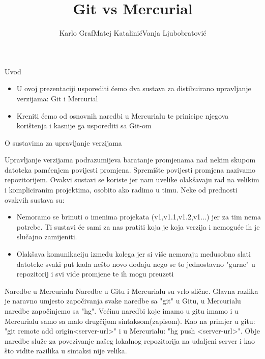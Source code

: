 \documentclass{beamer}
\title[]{Git vs Mercurial}
\author{Karlo Graf\newline Matej Katalinić\newline Vanja Ljubobratović}
\institute{Tehnički Fakultet, Sveučilište u Rijeci}
\begin{document}
\begin{frame}
  \titlepage
\end{frame}


\begin{frame}{Uvod}

\begin{itemize}
  \item U ovoj prezentaciji usporediti ćemo dva sustava za distibuirano upravljanje verzijama: Git i Mercurial
  \item Kreniti ćemo od osnovnih naredbi u Mercurialu te prinicipe njegova korištenja i kasnije ga usporediti sa Git-om
\end{itemize}

\vskip 1cm


\end{frame}

\begin{frame}{O sustavima za upravljanje verzijama}

Upravljanje verzijama podrazumijeva baratanje promjenama nad nekim skupom datoteka pamćenjem povijesti promjena. Spremište povijesti promjena nazivamo repozitorijem. Ovakvi sustavi se koriste jer nam uvelike olakšavaju rad na velikim i kompliciranim projektima, osobito ako radimo u timu. Neke od prednosti ovakvih sustava su:
\begin{itemize}
  \item Nemoramo se brinuti o imenima projekata (v1,v1.1,v1.2,v1...) jer za tim nema potrebe. Ti sustavi će sami za nas pratiti koja je koja verzija i nemoguće ih je slučajno zamijeniti.
  \item Olakšava komunikaciju između kolega jer si više nemoraju međusobno slati datoteke svaki put kada nešto novo dodaju nego se to jednostavno "gurne" u repozitorij i svi vide promjene te ih mogu preuzeti
\end{itemize}
\end{frame}
\begin{frame}{Naredbe u Mercurialu}
Naredbe u Gitu i Mercurialu su vrlo slične. Glavna razlika je naravno umjesto započivanja svake naredbe sa "git" u Gitu, u Mercurialu naredbe započinjemo sa "hg". Većinu naredbi koje imamo u gitu imamo i u Mercurialu samo sa malo drugčijom sintaksom(zapisom). Kao na primjer u gitu: "git remote add origin<server-url>" i u Mercurialu: "hg push <server-url>". Obje naredbe služe za povezivanje našeg lokalnog repozitorija na udaljeni server i kao što vidite razilika u sintaksi nije velika. 

\end{frame}
\end{document}
